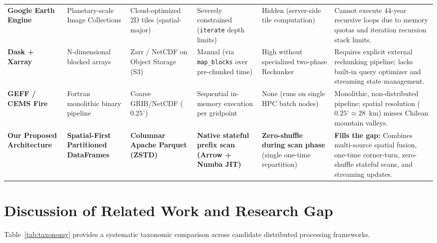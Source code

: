 \documentclass[10pt,conference]{IEEEtran}
\begin{document}
\begin{table}[t]
\begin{tabularx}{\textwidth}{l p{2.0cm} p{2.0cm} X X p{3.8cm}}
\addlinespace
\textbf{Google Earth Engine}~\cite{gorelick2017google} & Planetary-scale Image Collections & Cloud-optimized 2D tiles (spatial-major) & Severely constrained (\texttt{iterate} depth limits) & Hidden (server-side tile computation) & Cannot execute 44-year recursive loops due to memory quotas and iteration recursion stack limits. \\
\addlinespace
\textbf{Dask + Xarray}~\cite{rocklin2015dask, abernathey2021cloud} & N-dimensional blocked arrays & Zarr / NetCDF on Object Storage (S3) & Manual (via \texttt{map\_blocks} over pre-chunked time) & High without specialized two-phase Rechunker & Requires explicit external rechunking pipeline; lacks built-in query optimizer and streaming state management. \\
\addlinespace
\textbf{GEFF / CEMS Fire}~\cite{vitolo2020era5} & Fortran monolithic binary pipeline & Coarse GRIB/NetCDF ($0.25^\circ$) & Sequential in-memory execution per gridpoint & None (runs on single HPC batch nodes) & Monolithic, non-distributed pipeline; spatial resolution ($0.25^\circ \approx 28$~km) misses Chilean mountain valleys. \\
\addlinespace
\textbf{Our Proposed Architecture} & \textbf{Spatial-First Partitioned DataFrames} & \textbf{Columnar Apache Parquet (ZSTD)} & \textbf{Native stateful prefix scan (Arrow + Numba JIT)} & \textbf{Zero-shuffle during scan phase} (single one-time repartition) & \textbf{Fills the gap:} Combines multi-source spatial fusion, one-time corner-turn, zero-shuffle stateful scans, and streaming updates. \\
\bottomrule
\end{tabularx}
\end{table}

\section{Discussion of Related Work and Research Gap}

Table~\ref{tab:taxonomy} provides a systematic taxonomic comparison across candidate distributed processing frameworks. 
\end{document}
